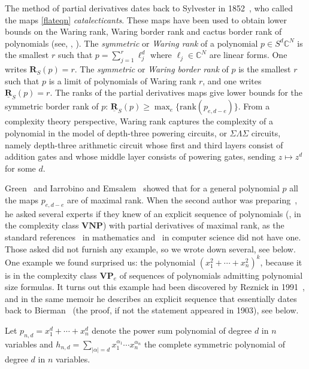 \documentclass{toc}
\newcommand{\bfR}{\mathbf{R}}
\newcommand{\bfVNP}{\mathbf{VNP}}
\newcommand{\bfVP}{\mathbf{VP}}
\def\BC{\mathbb C}
\def\trank{\mathrm{rank}}
\def\ur{\underline {\mathbf R}}
\begin{document}
 The method of partial derivatives  dates back to Sylvester in 1852~\cite{sylvestercat}, who called the maps \eqref{flateqn} \emph{catalecticants}. These maps have been used to obtain lower bounds on the Waring rank, Waring border rank and cactus border rank  of polynomials (see, \eg, \cite{MR3121848,MR1735271}). The \emph{symmetric} or \emph{Waring rank} of a polynomial $p\in S^d\BC^N$ is the smallest $r$ such that $p=\sum_{j=1}^r \ell_j^d$ where $\ell_j\in \BC^N$ are linear forms. One writes
%
$\bfR_S(p)=r$.  %
 The \emph{symmetric} or \emph{Waring border rank} of $p$ is the smallest $r$ such that $p$ is a limit of polynomials of Waring rank $r$, and one writes  $\ur_S(p)=r$.  The ranks of the partial derivatives maps give lower bounds for the symmetric border rank of $p$: $\ur_S(p) \geq \max_{e} \{ \trank(p_{e,d-e})\}$. {}From a complexity theory perspective, Waring rank captures the complexity of a polynomial in the model of depth-three powering circuits, or $\Sigma\Lambda\Sigma$ circuits, namely depth-three arithmetic circuit whose first and third 
layers consist of addition gates and whose middle layer consists of powering gates, sending $z\mapsto z^d$ for some $d$.

%
Green~\cite{MR0480472} and Iarrobino and Emsalem~\cite{MR515043} showed that for a general polynomial $p$ all the maps $p_{e,d-e}$ are of maximal rank. When the second author was preparing~\cite{Lsimons}, he asked several experts if they knew of an explicit  sequence of polynomials (\eg, in the complexity class $\bfVNP$) with partial derivatives of maximal rank, as the standard references~\cite{MR1735271} in mathematics and~\cite{MR2901512} in computer science did not have one. Those asked did not furnish any example, so we wrote down several, see below. One example we found surprised us: the polynomial $(x_1^2+\cdots +x_n^2)^k$, because it is in  the complexity class  $\bfVP_e$ of sequences of polynomials admitting polynomial size formulas. It turns out this example had been discovered by Reznick in 1991~\cite[Thm. 8.15]{MR1096187}, and in the same memoir he describes an explicit sequence that essentially dates back to  Bierman~\cite{MR1547094} (the proof, if not the statement appeared in 1903), see below.

 Let $p_{n,d}=x_1^d +\cdots + x_n^d$ denote the power sum polynomial  of degree $d$ in $n$ variables and $h_{n,d}=\sum_{\vert \alpha \vert=d}x_1^{\alpha_1}\cdots x_{n}^{\alpha_n}$ the complete symmetric polynomial  of degree $d$ in $n$ variables. 
\end{document}
